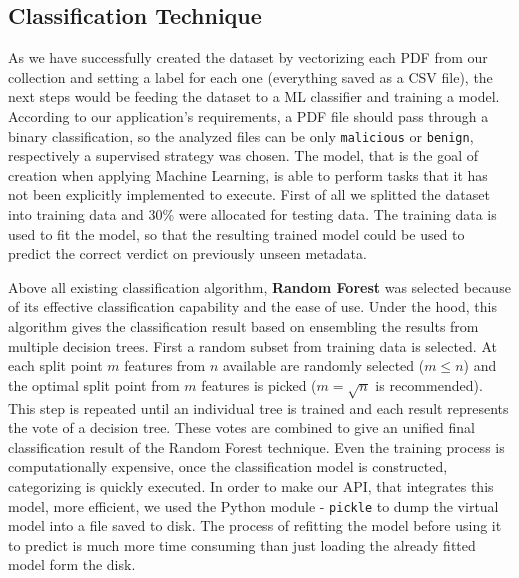 \subsection{Classification Technique}
As we have successfully created the dataset by vectorizing each PDF from our collection and setting a label for each one (everything saved as a CSV file), the next steps would be feeding the dataset to a ML classifier and training a model. According to our application's requirements, a PDF file should pass through a binary classification, so the analyzed files can be only \texttt{malicious} or \texttt{benign}, respectively a supervised strategy was chosen. The model, that is the goal of creation when applying Machine Learning, is able to perform tasks that it has not been explicitly implemented to execute. First of all we splitted the dataset into training data and 30\% were allocated for testing data. The training data is used to fit the model, so that the resulting trained model could be used to predict the correct verdict on previously unseen metadata. \par 
Above all existing classification algorithm, \textbf{Random Forest} was selected because of its effective classification capability and the ease of use. Under the hood, this algorithm gives the classification result based on ensembling the results from multiple decision trees. First a random subset from training data is selected. At each split point $m$ features from $n$ available are randomly selected ($m \leqslant n$) and the optimal split point from $m$ features is picked ($m = \sqrt{n}$ is recommended). This step is repeated until an individual tree is trained and each result represents the vote of a decision tree. These votes are combined to give an unified final classification result of the Random Forest technique.
Even the training process is computationally expensive, once the classification model is constructed, categorizing is quickly executed. In order to make our API, that integrates this model, more efficient, we used the Python module - \texttt{pickle} to dump the virtual model into a file saved to disk. The process of refitting the model before using it to predict is much more time consuming than just loading the already fitted model form the disk.


